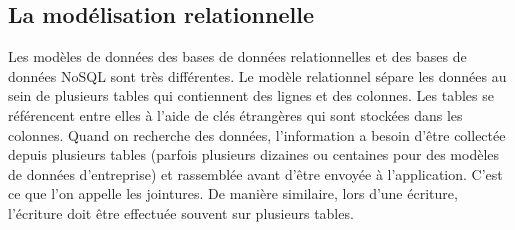 \subsection*{La modélisation relationnelle}
\label{subsec:modelisationRelationnelle}
	Les modèles de données des bases de données relationnelles et des bases de données NoSQL sont très différentes. Le modèle relationnel sépare les données au sein de plusieurs tables qui contiennent des lignes et des colonnes. Les tables se référencent entre elles à l'aide de clés étrangères qui sont stockées dans les colonnes. Quand on recherche des données, l'information a besoin d'être collectée depuis plusieurs tables (parfois plusieurs dizaines ou centaines pour des modèles de données d'entreprise) et rassemblée avant d'être envoyée à l'application. C'est ce que l'on appelle les jointures. De manière similaire, lors d'une écriture, l'écriture doit être effectuée souvent sur plusieurs tables.




